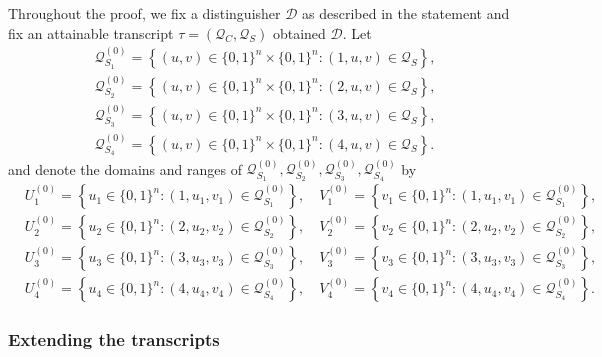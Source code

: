 Throughout the proof, we fix a distinguisher $\mathcal{D}$ as described in the statement and fix an attainable transcript $\tau =\left(\mathcal{Q}_{C}, \mathcal{Q}_{S}\right)$ obtained $\mathcal{D}$. Let
%
$$
\begin{aligned}
&\mathcal{Q}_{S_{1}}^{(0)}=\left\{(u, v) \in\{0,1\}^{n} \times\{0,1\}^{n}:(1, u, v) \in \mathcal{Q}_{S} \right\},\\
&\mathcal{Q}_{S_{2}}^{(0)}=\left\{(u, v) \in\{0,1\}^{n} \times\{0,1\}^{n}:(2, u, v) \in \mathcal{Q}_{S} \right\},\\
&\mathcal{Q}_{S_{3}}^{(0)}=\left\{(u, v) \in\{0,1\}^{n} \times\{0,1\}^{n}:(3, u, v) \in \mathcal{Q}_{S} \right\},\\
&\mathcal{Q}_{S_{4}}^{(0)}=\left\{(u, v) \in\{0,1\}^{n} \times\{0,1\}^{n}:(4, u, v) \in \mathcal{Q}_{S} \right\}.
\end{aligned}
$$
%
and denote the domains and ranges of $\mathcal{Q}_{S_{1}}^{(0)}, \mathcal{Q}_{S_{2}}^{(0)}, \mathcal{Q}_{S_{3}}^{(0)}, \mathcal{Q}_{S_{4}}^{(0)}$ by        {\small
%
\begin{align*}
&U_{1}^{(0)}=\left\{u_{1} \in\{0,1\}^{n}:\left(1, u_{1}, v_{1}\right) \in \mathcal{Q}_{S_{1}}^{(0)}\right\}, \quad V_{1}^{(0)}=\left\{v_{1} \in\{0,1\}^{n}:\left(1, u_{1}, v_{1}\right) \in \mathcal{Q}_{S_{1}}^{(0)}\right\},\\
&U_{2}^{(0)}=\left\{u_{2} \in\{0,1\}^{n}:\left(2, u_{2}, v_{2}\right) \in \mathcal{Q}_{S_{2}}^{(0)}\right\}, \quad V_{2}^{(0)}=\left\{v_{2} \in\{0,1\}^{n}:\left(2, u_{2}, v_{2}\right) \in \mathcal{Q}_{S_{2}}^{(0)}\right\},\\
&U_{3}^{(0)}=\left\{u_{3} \in\{0,1\}^{n}:\left(3, u_{3}, v_{3}\right) \in \mathcal{Q}_{S_{3}}^{(0)}\right\}, \quad V_{3}^{(0)}=\left\{v_{3} \in\{0,1\}^{n}:\left(3, u_{3}, v_{3}\right) \in \mathcal{Q}_{S_{3}}^{(0)}\right\},\\
&U_{4}^{(0)}=\left\{u_{4} \in\{0,1\}^{n}:\left(4, u_{4}, v_{4}\right) \in \mathcal{Q}_{S_{4}}^{(0)}\right\}, \quad V_{4}^{(0)}=\left\{v_{4} \in\{0,1\}^{n}:\left(4, u_{4}, v_{4}\right) \in \mathcal{Q}_{S_{4}}^{(0)}\right\}.
\end{align*}
}%
%



\subsubsection{Extending the transcripts}

